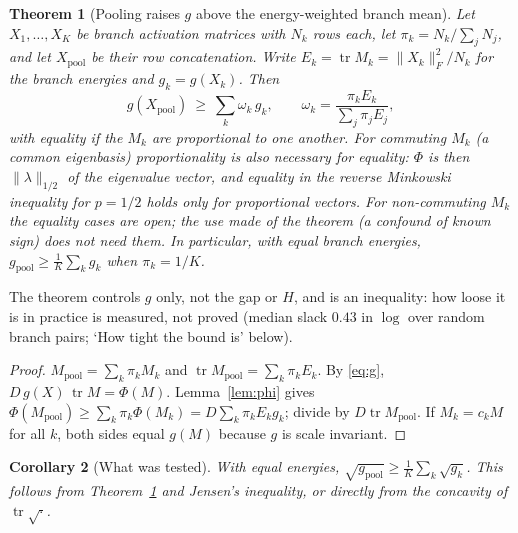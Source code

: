 \documentclass[11pt]{article}
\newtheorem{theorem}{Theorem}
\newtheorem{corollary}[theorem]{Corollary}
\theoremstyle{definition}
\newcommand{\tr}{\operatorname{tr}}
\begin{document}
\begin{theorem}[Pooling raises $g$ above the energy-weighted branch mean]\label{thm:pool}
Let $X_1,\dots,X_K$ be branch activation matrices with $N_k$ rows each, let $\pi_k=N_k/\sum_jN_j$, and let $X_{\mathrm{pool}}$ be their row concatenation. Write $E_k=\tr M_k=\|X_k\|_F^2/N_k$ for the branch energies and $g_k=g(X_k)$. Then
\begin{equation}\label{eq:pool}
 g(X_{\mathrm{pool}})\ \ge\ \sum_{k}\omega_k\,g_k,\qquad \omega_k=\frac{\pi_kE_k}{\sum_j\pi_jE_j},
\end{equation}
with equality if the $M_k$ are proportional to one another. For commuting $M_k$ (a common eigenbasis) proportionality is also necessary for equality: $\Phi$ is then $\|\lambda\|_{1/2}$ of the eigenvalue vector, and equality in the reverse Minkowski inequality for $p=1/2$ holds only for proportional vectors. For non-commuting $M_k$ the equality cases are open; the use made of the theorem (a confound of known sign) does not need them. In particular, with equal branch energies, $g_{\mathrm{pool}}\ge\frac1K\sum_k g_k$ when $\pi_k=1/K$.
\end{theorem}
The theorem controls $g$ only, not the gap or $H$, and is an inequality: how loose it is in practice is measured, not proved (median slack $0.43$ in $\log$ over random branch pairs; `How tight the bound is' below).
\begin{proof}
$M_{\mathrm{pool}}=\sum_k\pi_kM_k$ and $\tr M_{\mathrm{pool}}=\sum_k\pi_kE_k$. By \eqref{eq:g}, $D\,g(X)\,\tr M=\Phi(M)$. Lemma~\ref{lem:phi} gives $\Phi(M_{\mathrm{pool}})\ge\sum_k\pi_k\Phi(M_k)=D\sum_k\pi_kE_kg_k$; divide by $D\tr M_{\mathrm{pool}}$. If $M_k=c_kM$ for all $k$, both sides equal $g(M)$ because $g$ is scale invariant.
\end{proof}

\begin{corollary}[What was tested]\label{cor:eq}
With equal energies, $\sqrt{g_{\mathrm{pool}}}\ge\tfrac1K\sum_k\sqrt{g_k}$. This follows from Theorem~\ref{thm:pool} and Jensen's inequality, or directly from the concavity of $\tr\sqrt\cdot$.
\end{corollary}
\end{document}
